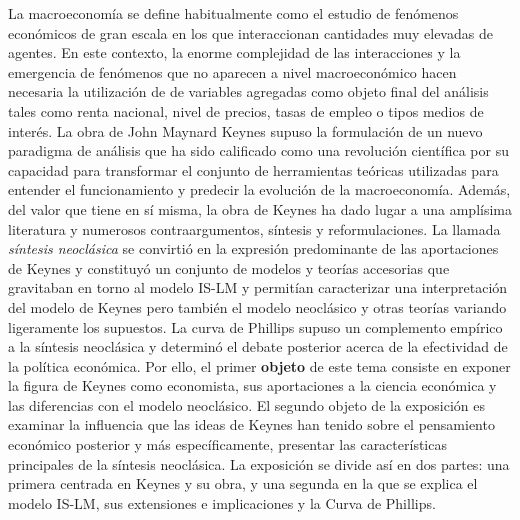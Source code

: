 \documentclass{nuevotema}
\begin{document}
\ideaclave

La macroeconomía se define habitualmente como el estudio de fenómenos económicos de gran escala en los que interaccionan cantidades muy elevadas de agentes. En este contexto, la enorme complejidad de las interacciones y la emergencia de fenómenos que no aparecen a nivel macroeconómico hacen necesaria la utilización de de variables agregadas como objeto final del análisis tales como renta nacional, nivel de precios, tasas de empleo o tipos medios de interés. La obra de John Maynard Keynes supuso la formulación de un nuevo paradigma de análisis que ha sido calificado como una revolución científica por su capacidad para transformar el conjunto de herramientas teóricas utilizadas para entender el funcionamiento y predecir la evolución de la macroeconomía. Además, del valor que tiene en sí misma, la obra de Keynes ha dado lugar a una amplísima literatura y numerosos contraargumentos, síntesis y reformulaciones. La llamada \textit{síntesis neoclásica} se convirtió en la expresión predominante de las aportaciones de Keynes y constituyó un conjunto de modelos y teorías accesorias que gravitaban en torno al modelo IS-LM y permitían caracterizar una interpretación del modelo de Keynes pero también el modelo neoclásico y otras teorías variando ligeramente los supuestos. La curva de Phillips supuso un complemento empírico a la síntesis neoclásica y determinó el debate posterior acerca de la efectividad de la política económica. Por ello, el primer \textbf{objeto} de este tema consiste en exponer la figura de Keynes como economista, sus aportaciones a la ciencia económica y las diferencias con el modelo neoclásico. El segundo objeto de la exposición es examinar la influencia que las ideas de Keynes han tenido sobre el pensamiento económico posterior y más específicamente, presentar las características principales de la síntesis neoclásica. La exposición se divide así en dos partes: una primera centrada en Keynes y su obra, y una segunda en la que se explica el modelo IS-LM, sus extensiones e implicaciones y la Curva de Phillips.
\end{document}
